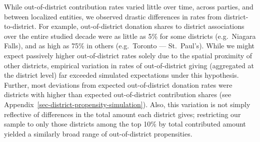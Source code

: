 \documentclass[
  letterpaper,
  DIV=11,
  numbers=noendperiod]{scrartcl}
\begin{document}
While out-of-district contribution rates varied little over time, across
parties, and between localized entities, we observed drastic differences
in rates from district-to-district. For example, out-of-district
donation shares to district associations over the entire studied decade
were as little as 5\% for some districts (e.g.~Niagara Falls), and as
high as 75\% in others (e.g.~Toronto --- St.~Paul's). While we might
expect passively higher out-of-district rates solely due to the spatial
proximity of other districts, empirical variation in rates of
out-of-district giving (aggregated at the district level) far exceeded
simulated expectations under this hypothesis. Further, most deviations
from expected out-of-district donation rates were districts with higher
than expected out-of-district contribution shares (see
Appendix~\ref{sec-district-propensity-simulation}). Also, this variation
is not simply reflective of differences in the total amount each
district gives; restricting our sample to only those districts among the
top 10\% by total contributed amount yielded a similarly broad range of
out-of-district propensities.
\end{document}
